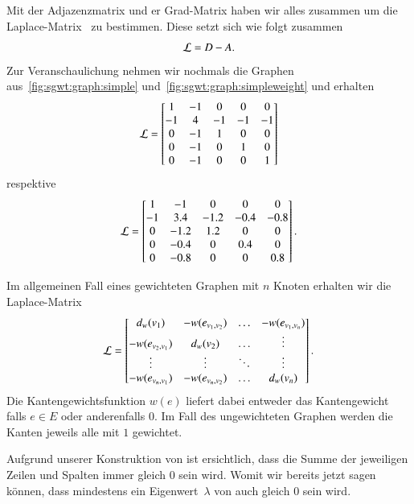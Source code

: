 Mit der Adjazenzmatrix und er Grad-Matrix haben wir alles zusammen um die 
Laplace-Matrix~\laplaceL{} zu bestimmen. Diese setzt sich wie folgt zusammen
\begin{equation}
\laplaceL = \degreeM - \adjacencyM.
\label{eq:sgwt:laplace}
\end{equation}
Zur Veranschaulichung nehmen wir nochmals die Graphen 
aus~\cref{fig:sgwt:graph:simple} und~\cref{fig:sgwt:graph:simpleweight} und 
erhalten
\begin{equation*}
\laplaceL =
\begin{bmatrix}
1 & -1 & 0 & 0 & 0 \\
-1 & 4 & -1 & -1 & -1 \\
0 & -1 & 1 & 0 & 0 \\
0 & -1 & 0 & 1 & 0 \\
0 & -1 & 0 & 0 & 1
\end{bmatrix}
\end{equation*}
respektive
\begin{equation*}
\laplaceL =
\begin{bmatrix}
1 & -1 & 0 & 0 & 0 \\
-1 & 3.4 & -1.2 & -0.4 & -0.8 \\
0 & -1.2 & 1.2 & 0 & 0 \\
0 & -0.4 & 0 & 0.4 & 0 \\
0 & -0.8 & 0 & 0 & 0.8
\end{bmatrix}.
\end{equation*}

Im allgemeinen Fall eines gewichteten Graphen mit $n$ Knoten erhalten wir die 
Laplace-Matrix
\begin{equation*}
\laplaceL =
\begin{bmatrix}
d_w(v_1) & -w(e_{v_1, v_2}) & \dotso & -w(e_{v_1, v_n}) \\
-w(e_{v_2, v_1}) & d_w(v_2) & \dotso & \vdots \\
\vdots & \vdots & \ddots &  \vdots \\
-w(e_{v_n, v_1}) & -w(e_{v_n, v_2}) & \dotso & d_w(v_n)
\end{bmatrix}.
\end{equation*}
Die Kantengewichtsfunktion $w(e)$ liefert dabei entweder das Kantengewicht 
falls $e \in E$ oder anderenfalls $0$. Im Fall des ungewichteten Graphen werden 
die Kanten jeweils alle mit $1$ gewichtet.

Aufgrund unserer Konstruktion von \laplaceL{} ist ersichtlich, dass die Summe 
der jeweiligen Zeilen und Spalten immer gleich $0$ sein wird. Womit wir bereits 
jetzt sagen k\"onnen, dass mindestens ein Eigenwert~$\lambda$ von \laplaceL{} 
auch gleich $0$ sein wird.

